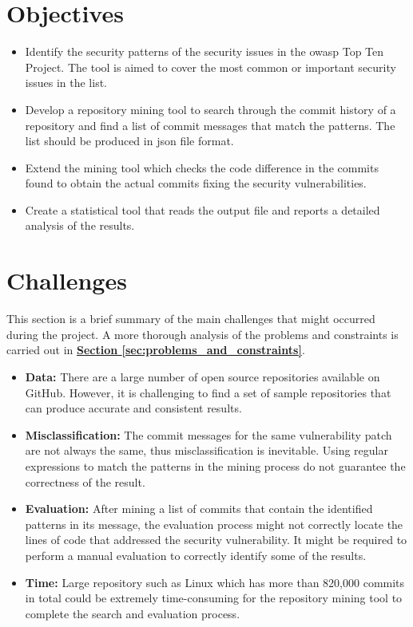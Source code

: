 \documentclass[12pt, a4paper]{report}
\begin{document}
\section{Objectives} \label{sec:objectives}
\begin{itemize}
  \item Identify the security patterns of the security issues in the \acrfull{owasp}
  Top Ten Project. The tool is aimed to cover the most common or important security issues in the
  list.
  \item Develop a repository mining tool to search through the commit history of a repository and
  find a list of commit messages that match the patterns. The list should be produced in
  \acrfull{json} file format.
  \item Extend the mining tool which checks the code difference in the commits found to obtain the
  actual commits fixing the security vulnerabilities.
  \item Create a statistical tool that reads the output file and reports a detailed analysis of the
  results.
\end{itemize}

\section{Challenges} \label{sec:challenges}
This section is a brief summary of the main challenges that might occurred during the project. A
more thorough analysis of the problems and constraints is carried out in
\hyperref[sec:problems_and_constraints]{\textbf{Section \ref*{sec:problems_and_constraints}}}.

\begin{itemize}
  \item \textbf{Data:} There are a large number of open source repositories available on GitHub.
  However, it is challenging to find a set of sample repositories that can produce accurate and
  consistent results.
  \item \textbf{Misclassification:} The commit messages for the same vulnerability patch are not
  always the same, thus misclassification is inevitable. Using regular expressions to match the
  patterns in the mining process do not guarantee the correctness of the result.
  \item \textbf{Evaluation:} After mining a list of commits that contain the identified patterns in
  its message, the evaluation process might not correctly locate the lines of code that addressed
  the security vulnerability. It might be required to perform a manual evaluation to correctly
  identify some of the results.
  \item \textbf{Time:} Large repository such as Linux which has more than 820,000 commits in total
  \cite{linux_repo} could be extremely time-consuming for the repository mining tool to complete the
  search and evaluation process.
\end{itemize}
\end{document}
